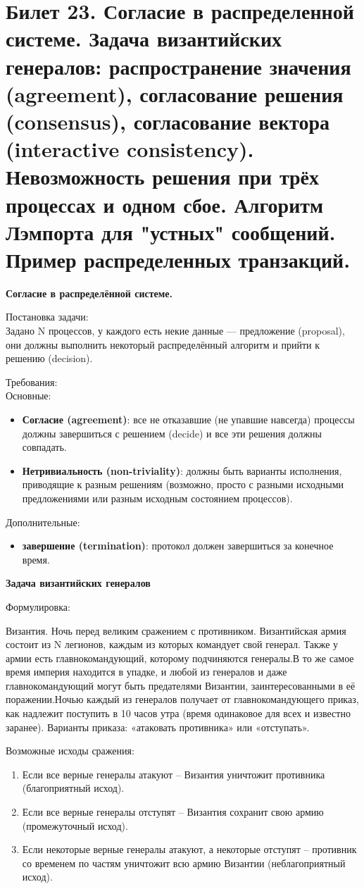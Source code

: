 \newpage
\section{Билет 23. Согласие в распределенной системе. Задача византийских генералов: распространение значения (agreement), согласование решения (consensus), согласование вектора (interactive consistency). Невозможность решения при трёх процессах и одном сбое. Алгоритм Лэмпорта для "устных" сообщений. Пример распределенных транзакций.}

\textbf{Согласие в распределённой системе.} 

Постановка задачи: \\
Задано N процессов, у каждого есть некие данные — предложение (proposal), они должны выполнить некоторый распределённый алгоритм и прийти к решению (decision).

Требования: \\
Основные:
\begin{itemize}
\item \textbf{Согласие (agreement)}: все не отказавшие (не упавшие навсегда) процессы должны завершиться с решением (decide) и все эти решения должны совпадать.
\item \textbf{Нетривиальность (non-triviality)}: должны быть варианты исполнения, приводящие к разным решениям (возможно, просто с разными исходными предложениями или разным исходным состоянием процессов).
\end{itemize}
Дополнительные: 
\begin{itemize}
\item \textbf{завершение (termination)}: протокол должен завершиться за конечное время.
\end{itemize}

\textbf{Задача византийских генералов} 

Формулировка: 

Византия. Ночь перед великим сражением с противником. Византийская армия состоит из N легионов, каждым из которых командует свой генерал. Также у армии есть главнокомандующий, которому подчиняются генералы.В то же самое время империя находится в упадке, и любой из генералов и даже главнокомандующий могут быть предателями Византии, заинтересованными в её поражении.Ночью каждый из генералов получает от главнокомандующего приказ, как надлежит поступить в 10 часов утра (время одинаковое для всех и известно заранее). Варианты приказа: «атаковать противника» или «отступать».

Возможные исходы сражения:
\begin{enumerate}
\item Если все верные генералы атакуют -- Византия уничтожит противника (благоприятный исход).
\item Если все верные генералы отступят -- Византия сохранит свою армию (промежуточный исход).
\item Если некоторые верные генералы атакуют, а некоторые отступят -- противник со временем по частям уничтожит всю армию Византии (неблагоприятный исход).
\end{enumerate}
   
